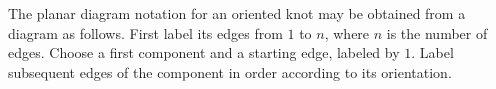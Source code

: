 
The planar diagram notation for an oriented knot may be obtained from a diagram
as follows. First label its edges from $1$ to $n$, where $n$ is the number of
edges. Choose a first component and a starting edge, labeled by $1$. Label
subsequent edges of the component in order according to its orientation. 

